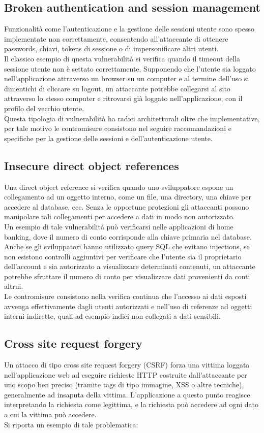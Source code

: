 \subsection{Broken authentication and session management}
Funzionalità come l'autenticazione e la gestione delle sessioni utente sono spesso implementate non correttamente, consentendo all'attaccante di ottenere passwords, chiavi, tokens di sessione o di impersonificare altri utenti.\\
Il classico esempio di questa vulnerabilità si verifica quando il timeout della sessione utente non è settato correttamente. Supponendo che l'utente sia loggato nell'applicazione attraverso un browser su un computer e al termine dell'uso si dimentichi di cliccare su logout, un attaccante potrebbe collegarsi al sito attraverso lo stesso computer e ritrovarsi già loggato nell'applicazione, con il profilo del vecchio utente. \\
Questa tipologia di vulnerabilità ha radici architetturali oltre che implementative, per tale motivo le contromisure consistono nel seguire raccomandazioni e specifiche per la gestione delle sessioni e dell'autenticazione utente.

\subsection{Insecure direct object references}
Una direct object reference si verifica quando uno sviluppatore espone un collegamento ad un oggetto interno, come un file, una directory, una chiave per accedere al database, ecc. Senza le opportune protezioni gli attaccanti possono manipolare tali collegamenti per accedere a dati in modo non autorizzato.\\
Un esempio di tale vulnerabilità può verificarsi nelle applicazioni di home banking, dove il numero di conto corrisponde alla chiave primaria nel database. Anche se gli sviluppatori hanno utilizzato query SQL che evitano injections, se non esistono controlli aggiuntivi per verificare che l'utente sia il proprietario dell'account e sia autorizzato a visualizzare determinati contenuti, un attaccante potrebbe sfruttare il numero di conto per visualizzare dati provenienti da conti altrui.\\
Le contromisure consistono nella verifica continua che l'accesso ai dati esposti avvenga effettivamente dagli utenti autorizzati e nell'uso di referenze ad oggetti interni indirette, quali ad esempio indici non collegati a dati sensibili. 

\subsection{Cross site request forgery}
Un attacco di tipo cross site request forgery (CSRF) forza una vittima loggata nell'applicazione web ad eseguire richieste HTTP costruite dall'attaccante per uno scopo ben preciso (tramite tags di tipo immagine, XSS o altre tecniche), generalmente ad insaputa della vittima. L'applicazione a questo punto reagisce interpretando la richiesta come legittima, e la richiesta può accedere ad ogni dato a cui la vittima può accedere.\\
Si riporta un esempio di tale problematica:\\

